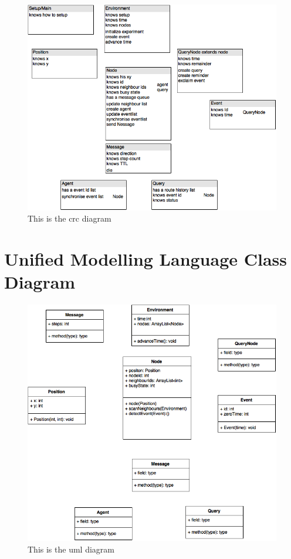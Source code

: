 \documentclass[a4paper,11pt,twoside]{article}
\begin{document}
\begin{figure}
\centering
\includegraphics[width=\textwidth]{crc.png}
\caption{This is the crc diagram}
\label{fig:crc}
\end{figure}

\section{Unified Modelling Language Class Diagram}

\begin{figure}
\centering
\includegraphics[width=\textwidth]{uml.png}
\caption{This is the uml diagram}
\label{fig:uml}
\end{figure}
\end{document}
